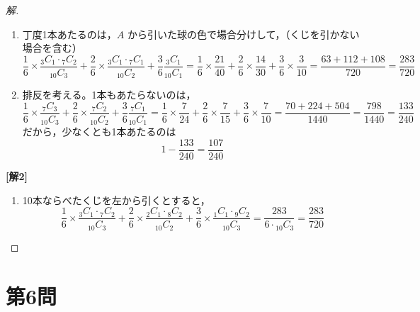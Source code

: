 \documentclass[../main.tex]{subfiles}
\begin{document}
\begin{proof}[解]
  \begin{enumerate}
    \item[(1)] 丁度1本あたるのは，$A$ から引いた球の色で場合分けして，（くじを引かない場合を含む）
      \[
        \frac{1}{6}\times\frac{{}_3C_1\cdot{}_7C_2}{{}_{10}C_3}+\frac{2}{6}\times\frac{{}_3C_1\cdot{}_7C_1}{{}_{10}C_2}+\frac{3}{6}\frac{{}_3C_1}{{}_{10}C_1}
        = \frac{1}{6}\times\frac{21}{40}+\frac{2}{6}\times\frac{14}{30}+\frac{3}{6}\times\frac{3}{10}
        = \frac{63+112+108}{720}=\frac{283}{720}
      \]

    \item[(2)] 排反を考える。1本もあたらないのは，
      \[
        \frac{1}{6}\times\frac{{}_7C_3}{{}_{10}C_3}+\frac{2}{6}\times\frac{{}_7C_2}{{}_{10}C_2}+\frac{3}{6}\frac{{}_7C_1}{{}_{10}C_1}
        = \frac{1}{6}\times\frac{7}{24}+\frac{2}{6}\times\frac{7}{15}+\frac{3}{6}\times\frac{7}{10}
        = \frac{70+224+504}{1440}=\frac{798}{1440}=\frac{133}{240}
      \]
      だから，少なくとも1本あたるのは
      \[
        1-\frac{133}{240}=\frac{107}{240}
      \]
  \end{enumerate}

  \medskip
  \noindent\textbf{[解2]}

  \begin{enumerate}
    \item[(1)] 10本ならべたくじを左から引くとすると，
      \[
        \frac{1}{6}\times\frac{{}_3C_1\cdot{}_7C_2}{{}_{10}C_3}+\frac{2}{6}\times\frac{{}_2C_1\cdot{}_8C_2}{{}_{10}C_2}+\frac{3}{6}\times\frac{{}_1C_1\cdot{}_9C_2}{{}_{10}C_3}
        = \frac{283}{6\cdot{}_{10}C_3}=\frac{283}{720}
      \]
  \end{enumerate}
\end{proof}

\newpage

\section*{第6問}
\end{document}
